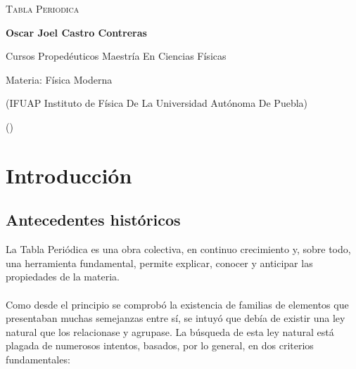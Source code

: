 \documentclass[12pt]{article}
\begin{document}
	
	\begin{titlepage}
	
		\centering
		{\bfseries
               {\scshape\LARGE Tabla Periodica \par}
		\par}
		\vspace{1cm}
		{\LARGE \textbf{Oscar Joel Castro Contreras} \par}
          \vspace{0.5cm}
          {\large Cursos Propedéuticos Maestría En Ciencias Físicas\par}
          {\large Materia: Física Moderna\par}
		\vspace{1cm}
           
          {\large (IFUAP Instituto de Física De La Universidad Autónoma De Puebla) \par}
		{\large (\Today) \par}
		\thispagestyle{empty}
          \vspace{1cm}

	\end{titlepage}

     \newpage

     \thispagestyle{empty}

     \begingroup
     
     \renewcommand{\addtocontents}[2]{}
	
     \tableofcontents		
	
     \endgroup
	
     \newpage
     
     \setcounter{page}{1} 
	
     \section{Introducción}\label{sec:Introducción}

          \subsection{Antecedentes históricos}\label{sec:Antecedentes históricos}
               La Tabla Periódica es una obra colectiva, en continuo crecimiento y, sobre todo, una herramienta fundamental, permite explicar, conocer y anticipar las propiedades de la materia.\\\\
               Como desde el principio se comprobó la existencia de familias de elementos que presentaban muchas semejanzas entre sí, se intuyó que debía de existir una ley natural que los relacionase y agrupase. La búsqueda de esta ley natural está plagada de numerosos intentos, basados, por lo general, en dos criterios fundamentales:
               
\end{document}
